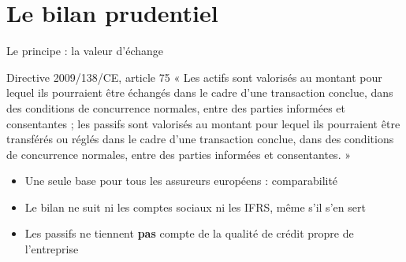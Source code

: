 \documentclass[10pt,aspectratio=169]{beamer}
\begin{document}
\section{Le bilan prudentiel}

\begin{frame}{Le principe : la valeur d'échange}
\begin{block}{Directive 2009/138/CE, article 75}
\small
« Les actifs sont valorisés au montant pour lequel ils pourraient être échangés dans le cadre d'une
transaction conclue, dans des conditions de concurrence normales, entre des parties informées et
consentantes ; les passifs sont valorisés au montant pour lequel ils pourraient être transférés ou
réglés dans le cadre d'une transaction conclue, dans des conditions de concurrence normales, entre
des parties informées et consentantes. »
\end{block}
\begin{itemize}
  \item Une seule base pour tous les assureurs européens : comparabilité
  \item Le bilan ne suit ni les comptes sociaux ni les IFRS, même s'il s'en sert
  \item Les passifs ne tiennent \textbf{pas} compte de la qualité de crédit propre de l'entreprise
\end{itemize}
\end{frame}
\end{document}

